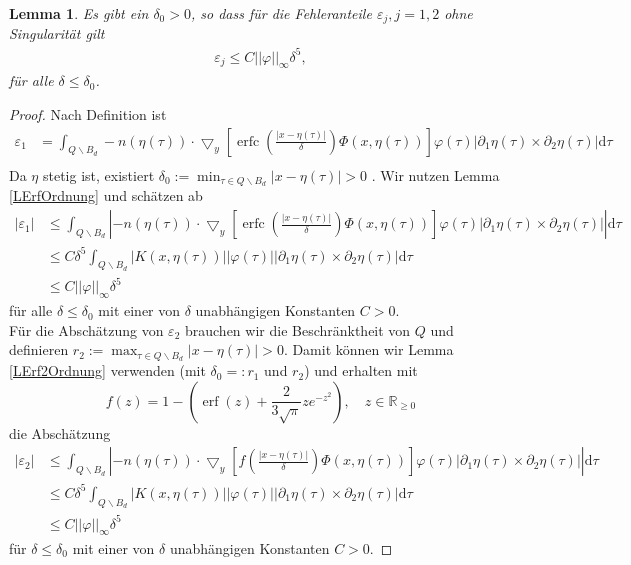 \documentclass[12pt,a4paper]{scrartcl}
\newtheorem{Lemma}[Satz]{Lemma}
\newcommand{\dd}{\mathrm{d}}
\numberwithin{equation}{section}
\newcommand{\R}{\mathbb{R}} %
\newcommand{\grad}{\bigtriangledown}
\newcommand{\erf}{\operatorname{erf}}
\newcommand{\erfc}{\operatorname{erfc}}
\begin{document}
\begin{Lemma} \label{LepsohneSing}
Es gibt ein $\delta_0>0$, so dass für die Fehleranteile $\varepsilon_j, j=1,2$ ohne Singularität gilt
\begin{align*}
\varepsilon_j \leq C ||\varphi||_\infty \delta^5,
\end{align*}
für alle $\delta \leq \delta_0$. 
\end{Lemma}
\begin{proof}
Nach Definition ist
\begin{align*}
\varepsilon_1& =\int_{Q \backslash B_d} -n(\eta(\tau)) \cdot \grad_y \left[ \erfc \left(\frac{|x-\eta(\tau)|}{\delta}\right)  \Phi (x,\eta(\tau)) \right]\varphi(\tau) |\partial_1 \eta (\tau) \times \partial_2 \eta(\tau)| \dd \tau \\
\end{align*}
Da $\eta$ stetig ist, existiert $\delta_0 := \min_{\tau \in Q  \backslash B_d} |x- \eta(\tau)|>0$ . Wir nutzen Lemma \ref{LErfOrdnung} und schätzen ab
\begin{align*}
|\varepsilon_1| 
&\leq \int_{Q \backslash B_d} \left|-n(\eta(\tau)) \cdot \grad_y \left[ \erfc \left(\frac{|x-\eta(\tau)|}{\delta}\right)  \Phi (x,\eta(\tau)) \right]\varphi(\tau) |\partial_1 \eta (\tau) \times \partial_2 \eta(\tau)| \right| \dd \tau \\
& \leq C \delta^5 \int_{Q \backslash B_d}| K(x,\eta(\tau))||\varphi(\tau)| |\partial_1 \eta (\tau) \times \partial_2 \eta(\tau)| \dd \tau \\
& \leq C ||\varphi||_{\infty} \delta^5
\end{align*}
für alle $\delta \leq \delta_0$ mit einer von $\delta$ unabhängigen Konstanten $C>0$. \\ 
Für die Abschätzung von $\varepsilon_2$ brauchen wir die Beschränktheit von $Q$ und definieren $r_2:=\max_{\tau \in Q  \backslash B_d} |x- \eta(\tau)|>0$. Damit können wir Lemma \ref{LErf2Ordnung} verwenden (mit $\delta_0=:r_1$ und $r_2$) und erhalten mit 
\[
f(z)=
1- \left(\erf(z)+\frac{2}{3\sqrt{\pi}}z e^{-z^2}\right) , \quad z \in \R_{\geq 0}
\]
die Abschätzung
\begin{align*}
|\varepsilon_2| 
&\leq \int_{Q \backslash B_d} \left|-n(\eta(\tau)) \cdot \grad_y \left[ f \left(\frac{|x-\eta(\tau)|}{\delta}\right)  \Phi (x,\eta(\tau)) \right]\varphi(\tau) |\partial_1 \eta (\tau) \times \partial_2 \eta(\tau)| \right| \dd \tau \\
& \leq C \delta^5 \int_{Q \backslash B_d}| K(x,\eta(\tau))||\varphi(\tau)| |\partial_1 \eta (\tau) \times \partial_2 \eta(\tau)| \dd \tau \\
& \leq C ||\varphi||_{\infty} \delta^5
\end{align*}
für $\delta \leq \delta_0$ mit einer von $\delta$ unabhängigen Konstanten $C>0$.
\end{proof}
\end{document}
